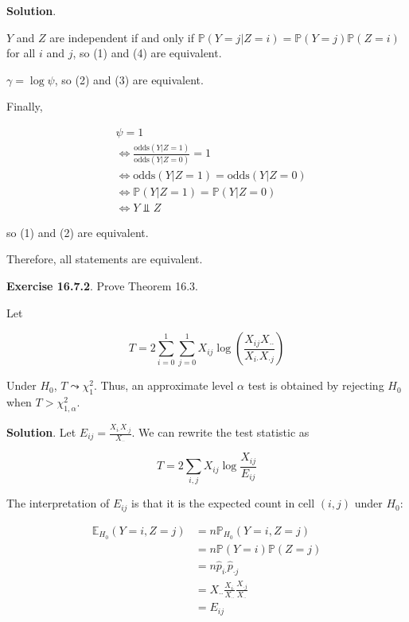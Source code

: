 \textbf{Solution}.

\(Y\) and \(Z\) are independent if and only if
\(\mathbb{P}(Y = j | Z = i) = \mathbb{P}(Y = j) \mathbb{P}(Z = i)\) for
all \(i\) and \(j\), so (1) and (4) are equivalent.

\(\gamma = \log \psi\), so (2) and (3) are equivalent.

Finally,

\begin{align*}
&\psi = 1\\
&\Leftrightarrow \frac{\text{odds}(Y | Z = 1)}{\text{odds}(Y | Z = 0)} = 1 \\
&\Leftrightarrow \text{odds}(Y | Z = 1) = \text{odds}(Y | Z = 0) \\
&\Leftrightarrow \mathbb{P}(Y | Z = 1) = \mathbb{P}(Y | Z = 0) \\
&\Leftrightarrow Y \text{ ⫫ } Z
\end{align*}

so (1) and (2) are equivalent.

Therefore, all statements are equivalent.

\textbf{Exercise 16.7.2}. Prove Theorem 16.3.

Let

\[ T = 2 \sum_{i=0}^{1} \sum_{j=0}^{1} X_{ij} \log \left( \frac{X_{ij} X_{\text{··}}}{X_{i\text{·}} X_{\text{·}j}} \right)\]

Under \(H_{0}\), \(T \leadsto \chi_{1}^{2}\). Thus, an approximate level
\(\alpha\) test is obtained by rejecting \(H_{0}\) when
\(T > \chi_{1, \alpha}^{2}\).

\textbf{Solution}. Let
\(E_{ij} = \frac{X_{i\text{·}} X_{\text{·}j}}{X_\text{··}}\). We can
rewrite the test statistic as

\[ T = 2 \sum_{i, j} X_{ij} \log \frac{X_{ij}}{E_{ij}} \]

The interpretation of \(E_{ij}\) is that it is the expected count in
cell \((i, j)\) under \(H_{0}\):

\begin{align*}
\mathbb{E}_{H_{0}}(Y = i, Z = j) &= n \mathbb{P}_{H_{0}}(Y = i, Z = j) \\
&= n \mathbb{P}(Y = i) \mathbb{P}(Z = j) \\
&= n \hat{p}_{i\text{·}} \hat{p}_{\text{·}j} \\
&= X_{\text{··}} \frac{X_{i\text{·}}}{X_{\text{··}}} \frac{X_{\text{·}j}}{X_{\text{··}}} \\
&= E_{ij}
\end{align*}

